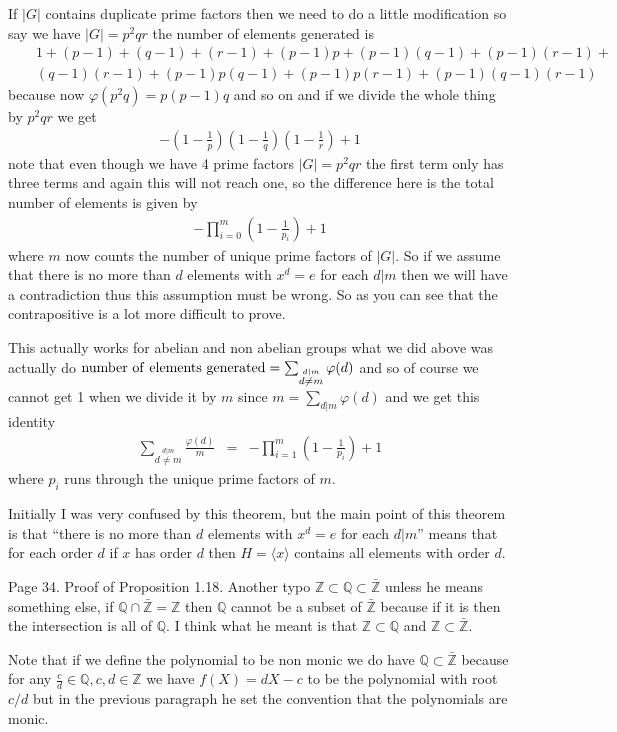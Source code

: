 \documentclass[aps,preprint,preprintnumbers,nofootinbib,showpacs,prd]{revtex4-1}
\newcommand{\nbea}{\begin{eqnarray*}}
\newcommand{\neea}{\end{eqnarray*}}
\begin{document}
If $|G|$ contains duplicate prime factors then we need to do a little modification so say we have $|G| = p^2qr$ the number of elements generated is 
%
\nbea
&&1 + (p - 1) + (q - 1) + (r - 1) + (p - 1)p  + (p - 1)(q - 1) + (p - 1)(r - 1) +  \\ 
&&(q - 1)(r - 1)  + (p - 1)p(q - 1) + (p - 1)p(r - 1) + (p - 1)(q - 1)(r - 1) 
\neea
%  
because now $\varphi(p^2 q) = p(p-1)q$ and so on and if we divide the whole thing by $p^2qr$ we get 
%
\nbea
-\left( 1 - \frac{1}{p} \right) \left( 1 - \frac{1}{q} \right) \left( 1 - \frac{1}{r} \right)  + 1   
\neea
% 
note that even though we have 4 prime factors $|G| = p^2 qr$ the first term only has three terms and again this will not reach one, so the difference here is the total number of elements is given by 
%
\nbea
-\prod_{i = 0}^m \left( 1 - \frac{1}{p_i} \right ) + 1
\neea
%
where $m$ now counts the number of unique prime factors of $|G|$. So if we assume that there is no more than $d$ elements with $x^d = e$ for each $d|m$ then we will have a contradiction thus this assumption must be wrong. So as you can see that the contrapositive is a lot more difficult to prove. 

This actually works for abelian and non abelian groups what we did above was actually do ${\rm number ~ of ~ elements ~  generated} = \sum_{\stackrel{d|m}{d \neq m}} \varphi(d)$ and so of course we cannot get 1 when we divide it by $m$ since $m = \sum_{d|m} \varphi(d)$ and we get this identity    
%
\nbea
\sum_{\stackrel{d|m}{d\neq m}} \frac{\varphi(d)}{m} & = & - \prod_{i = 1}^m \left ( 1 - \frac{1}{p_i} \right ) + 1
\neea
%
where $p_i$ runs through the unique prime factors of $m$.            

Initially I was very confused by this theorem, but the main point of this theorem is that ``there is no more than $d$ elements with $x^d = e$ for each $d|m$'' means that for each order $d$ if $x$ has order $d$ then $H = \langle x \rangle$ contains all elements with order $d$. 





  
Page 34. Proof of Proposition 1.18. Another typo $\mathbb{Z} \subset \mathbb{Q} \subset \bar{\mathbb{Z}}$ unless he means something else, if $\mathbb{Q} \cap \bar{\mathbb{Z}} = \mathbb{Z}$ then $\mathbb{Q}$ cannot be a subset of $\bar{\mathbb{Z}}$ because if it is then the intersection is all of $\mathbb{Q}$. I think what he meant is that $\mathbb{Z} \subset \mathbb{Q}$ and $\mathbb{Z} \subset \bar{\mathbb{Z}}$. 

Note that if we define the polynomial to be non monic we do have $\mathbb{Q} \subset \bar{\mathbb{Z}}$ because for any $\frac{c}{d} \in \mathbb{Q}, c,d \in \mathbb{Z}$ we have $f(X) = dX - c$ to be the polynomial with root $c/d$ but in the previous paragraph he set the convention that the polynomials are monic. 
\end{document}
